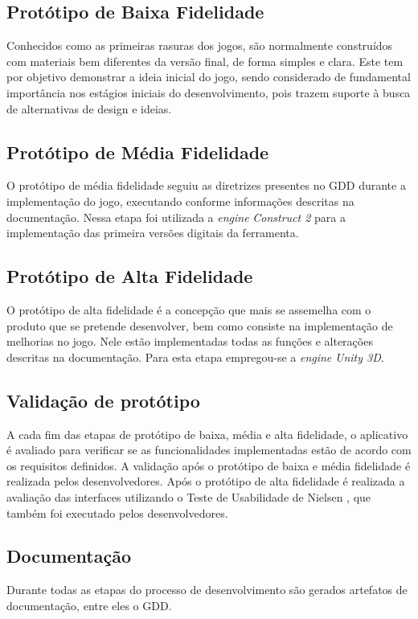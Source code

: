 \documentclass[12pt]{article}
\begin{document}
	\subsection{Protótipo de Baixa Fidelidade}
		Conhecidos como as primeiras rasuras dos jogos, são normalmente construídos com materiais bem diferentes da versão final, de forma simples e clara. Este tem por objetivo demonstrar a ideia inicial do jogo, sendo considerado de fundamental importância nos estágios iniciais do desenvolvimento, pois trazem suporte à busca de alternativas de design e ideias.
	
	\subsection{Protótipo de Média Fidelidade}
		O protótipo de média fidelidade seguiu as diretrizes presentes no GDD durante a implementação do jogo, executando conforme informações descritas na documentação. Nessa etapa foi utilizada a \textit{engine} \textit{Construct 2} para a implementação das primeira versões digitais da ferramenta.
	
	\subsection{Protótipo de Alta Fidelidade}
		O protótipo de alta fidelidade é a concepção que mais se assemelha com o produto que se pretende desenvolver, bem como consiste na implementação de melhorias no jogo. Nele estão implementadas todas as funções e alterações descritas na documentação. Para esta etapa empregou-se a \textit{engine} \textit{Unity 3D}.
	
	\subsection{Validação de protótipo}
		A cada fim das etapas de protótipo de baixa, média e alta fidelidade, o aplicativo é avaliado para verificar se as funcionalidades implementadas estão de acordo com os requisitos definidos. A validação após o protótipo de baixa e média fidelidade é realizada pelos desenvolvedores. Após o protótipo de alta fidelidade é realizada a avaliação das interfaces utilizando o Teste de Usabilidade de Nielsen \cite{nielsen1994usability}, que também foi executado pelos desenvolvedores. 
		
	\subsection{Documentação}
		Durante todas as etapas do processo de desenvolvimento são gerados artefatos de documentação, entre eles o GDD.
		
\end{document}
